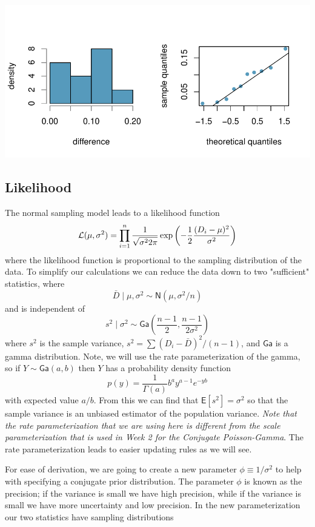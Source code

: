 \documentclass[11pt]{article}
\def\No{\textsf{N}}
\def\Ga{\textsf{Ga}}
\newcommand{\E}{\textsf{E}}
\begin{document}
\includegraphics{4-3-2-pair-notes-hist}

\subsection*{Likelihood}
The normal sampling model leads to a likelihood function 
\begin{equation}
{\cal{L}}(\mu, \sigma^2) = \prod_{i = 1}^{n} \frac{1}{\sqrt{\sigma^2 2 \pi}} \exp{\left( - \frac{1}{2}\frac{(D_i - \mu)^2}{\sigma^2} \right)} 
\label{eq:lik}
\end{equation}
where the likelihood function is proportional to the sampling distribution of the data.
To simplify our calculations we can reduce the data down to two "sufficient" statistics, where
$$ \bar{D} \mid \mu, \sigma^2 \sim \No(\mu,  \sigma^2/n)$$
and is independent of 
$$ 
s^2 \mid \sigma^2 \sim  \Ga\left(\frac{n - 1}{2},  \frac{n-1}{2 \sigma^2}\right)
$$
where $s^2$ is the sample variance, $s^2 = \sum(D_i - \bar{D})^2/(n-1)$, and $\Ga$ is a gamma distribution.  Note, we will use the rate parameterization of the gamma, so if $Y \sim \Ga(a, b)$ then $Y$ has a probability density function 
$$
p(y) = \frac{1}{\Gamma(a)} b^a y^{a - 1} e^{- y b} 
$$
with expected value $a/b$.  From this we can find that $\E[s^2] = \sigma^2$ so that the sample variance is an unbiased estimator of the population variance. {\it Note that the rate parameterization that we are using here is different from the scale parameterization that is used in Week 2 for the Conjugate Poisson-Gamma}.  The rate parameterization leads to easier updating rules as we will see.   


For ease of derivation, we are going to create a new parameter $\phi \equiv 1/\sigma^2$ to help with specifying a conjugate prior distribution.  The parameter $\phi$ is known as the precision;  if the variance is small we have high precision, while if the variance is small we have more uncertainty  and low precision.  In the new parameterization our two statistics have sampling distributions
\end{document}
